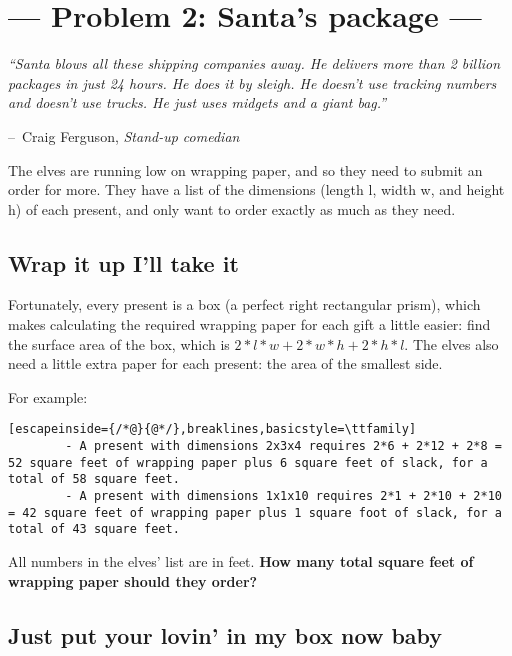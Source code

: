 \documentclass[12pt]{article}
\makeatletter
\newenvironment{chapquote}[2][2em]
  {\setlength{\@tempdima}{#1}%
   \def\chapquote@author{#2}%
   \parshape 1 \@tempdima \dimexpr\textwidth-2\@tempdima\relax%
   \itshape}
  {\par\normalfont\hfill--\ \chapquote@author\hspace*{\@tempdima}\par\bigskip}
\makeatother
\begin{document}
 
\lstset{language=python}

\section*{\hfil--- Problem 2: Santa's package ---\hfil}

 	\begin{chapquote}{Craig Ferguson, \textit{Stand-up comedian}}
 	``Santa blows all these shipping companies away. He delivers more than 2 billion packages in just 24 hours. He does it by sleigh. He doesn't use tracking numbers and doesn't use trucks. He just uses midgets and a giant bag.''
 	\end{chapquote}


    The elves are running low on wrapping paper, and so they need to submit an order for more. They have a list of the dimensions (length l, width w, and height h) of each present, and only want to order exactly as much as they need.


	\subsection* {Wrap it up I'll take it}

    Fortunately, every present is a box (a perfect right rectangular prism), which makes calculating the required wrapping paper for each gift a little easier: find the surface area of the box, which is \(2*l*w + 2*w*h + 2*h*l\). The elves also need a little extra paper for each present: the area of the smallest side.
    
    For example:

    
    \begin{lstlisting}[escapeinside={/*@}{@*/},breaklines,basicstyle=\ttfamily]
        - A present with dimensions 2x3x4 requires 2*6 + 2*12 + 2*8 = 52 square feet of wrapping paper plus 6 square feet of slack, for a total of 58 square feet.
        - A present with dimensions 1x1x10 requires 2*1 + 2*10 + 2*10 = 42 square feet of wrapping paper plus 1 square foot of slack, for a total of 43 square feet.
    \end{lstlisting}
    
    All numbers in the elves' list are in feet.
    \textbf{How many total square feet of wrapping paper should they order?}  

	\subsection* {Just put your lovin' in my box now baby}
\end{document}
